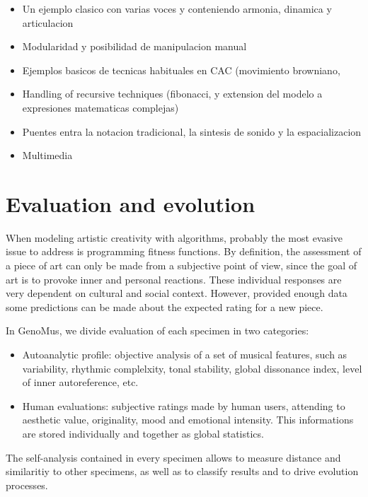 \documentclass{article}
\begin{document}
\begin{itemize}
\item Un ejemplo clasico con varias voces y conteniendo armonia, dinamica y articulacion
\item Modularidad y posibilidad de manipulacion manual
\item Ejemplos basicos de tecnicas habituales en CAC (movimiento browniano,
\item Handling of recursive techniques (fibonacci, y extension del modelo a expresiones matematicas complejas)
\item Puentes entra la notacion tradicional, la sintesis de sonido y la espacializacion
\item Multimedia
\end{itemize}









\section{Evaluation and evolution}

When modeling artistic creativity with algorithms, probably the most evasive issue to address is programming fitness functions. By definition, the assessment of a piece of art can only be made from a subjective point of view, since the goal of art is to provoke inner and personal reactions. These individual responses are very dependent on cultural and social context. However, provided enough data some predictions can be made about the expected rating for a new piece.

In GenoMus, we divide evaluation of each specimen in two categories:

\begin{itemize}
\item Autoanalytic profile: objective analysis of a set of musical features, such as variability, rhythmic complelxity, tonal stability, global dissonance index, level of inner autoreference, etc. 
\item Human evaluations: subjective ratings made by human users, attending to aesthetic value, originality, mood and emotional intensity. This informations are stored individually and together as global statistics.

\end{itemize}

The self-analysis contained in every specimen allows to measure distance and similaritiy to  
other specimens, as well as to classify results and to drive evolution processes.
\end{document}
